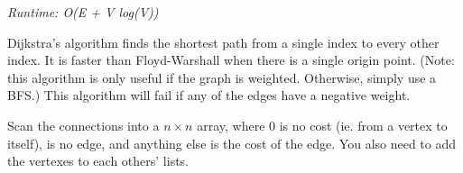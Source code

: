 
\textit{Runtime: O(E + V log(V))}

Dijkstra’s algorithm finds the shortest path from a single index to every other index. It is faster than Floyd-Warshall when there is a single origin point. (Note: this algorithm is only useful if the graph is weighted. Otherwise, simply use a BFS.) This algorithm will fail if any of the edges have a negative weight.

Scan the connections into a $n \times n$  array, where 0 is no cost (ie. from a vertex to itself),  is no edge, and anything else is the cost of the edge. You also need to add the vertexes to each others'  lists.



\newpage